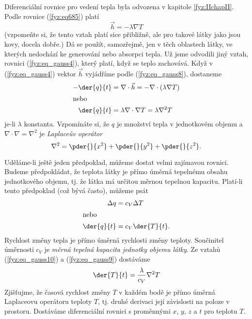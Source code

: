         Diferenciální rovnice pro vedení tepla byla odvozena v kapitole 
        \ref{fyz:IIchapII}. Podle rovnice (\ref{fyz:eq685}) platí
        \begin{equation}\label{fyz:eq_gauss8}
        \vec{h}=-\lambda\nabla T
        \end{equation}    
        (vzpomeňte si, že tento vztah platí sice přibližně, ale pro takové látky jako jsou kovy,
        docela dobře.) Dá se použít, samozřejmě, jen v těch oblastech látky, ve kterých nedochází ke
        generování nebo absorpci tepla. Už jsme odvodili jiný vztah, rovnici (\ref{fyz:eq_gauss4}),
        který platí, když se teplo zachovává. Když v (\ref{fyz:eq_gauss4}) vektor \(\vec{h}\)
        vyjádříme podle (\ref{fyz:eq_gauss8}), dostaneme
        \begin{align}
          - \der{q}{t} &= \nabla\cdot\vec{h} = - \nabla\cdot(\lambda\nabla T)     \nonumber    \\ 
          \intertext{nebo}
            \der{q}{t} &= \lambda\nabla\cdot\nabla T = \lambda\nabla^2 T     \label{fyz:eq_gauss9}
        \end{align}
        je-li \(\lambda\) konstanta. Vzpomínáte si, že \(q\) je množství tepla v jednotkovém objemu a
        \(\nabla\cdot\nabla = \nabla^2\) je \emph{Laplaceův operátor}
        \begin{equation*}
          \nabla^2= \pder{ }{x^2} + \pder{ }{y^2} + \pder{ }{z^2}.
        \end{equation*}       
      
        Uděláme-li ještě jeden předpoklad, můžeme dostat velmi zajímavou rovnici. Budeme 
        předpokládat, že teplota látky je přímo úměrná tepelnému obsahu jednotkového objemu, tj. že 
        látka má určitou  měrnou tepelnou kapacitu. Platí-li tento předpoklad (což bývá často), 
        můžeme psát
        \begin{align}
          \Delta q   &= c_V\Delta T                                        \nonumber    \\ 
          \intertext{nebo}
          \der{q}{t} &= c_V\der{T}{t}.                                     \label{fyz:eq_gauss10}
        \end{align}    
        Rychlost změny tepla je přímo úměrná rychlosti změny teploty. Součinitel úměrnosti \(c_V\)
        je \emph{měrná tepelná kapacita jednotky objemu látky}. Ze vztahů (\ref{fyz:eq_gauss10}) a
        (\ref{fyz:eq_gauss9}) dostáváme
        \begin{equation}\label{fyz:eq_gauss11}
          \der{T}{t} = \frac{\lambda}{c_V}\nabla^2T
        \end{equation}
        Zjišťujme, že časová rychlost změny \(T\) v každém bodě je přímo úměrná Laplaceovu operátoru 
        teploty \(T\), tj. druhé derivaci její závislosti na poloze v prostoru. Dostáváme 
        diferenciální rovnici s proměnnými \(x\), \(y\), \(z\) a \(t\) pro teplotu \(T\).
        
